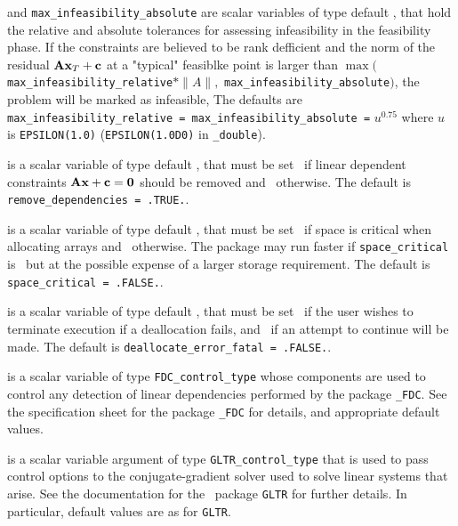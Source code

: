 \begin{description}
 and {\tt max\_infeasibility\_absolute}
are scalar variables of type default \realdp,
that hold the relative and absolute tolerances for assessing
infeasibility in the feasibility phase.  If the constraints are believed to be
rank defficient and the norm of the residual ${\mathbf{A}} {\mathbf{x}}_T + {\mathbf{c}}$
at a "typical" feasiblke point is larger than
  $\max( ${\tt max\_infeasibility\_relative}$ \ast \| A\|,$
{\tt max\_infeasibility\_absolute}$)$,
the problem will be marked as infeasible,
The defaults are
{\tt max\_infeasibility\_relative =
\tt max\_infeasibility\_absolute =} $u^{0.75}$
where $u$ is {\tt EPSILON(1.0)} ({\tt EPSILON(1.0D0)} in
{\tt \fullpackagename\_double}).

 is a scalar variable of type default \logical,
that must be set \true\ if linear dependent constraints
${\mathbf{A}} {\mathbf{x}} + {\mathbf{c}} = {\mathbf{0}}$ should be removed and \false\ otherwise.
The default is {\tt remove\_dependencies = .TRUE.}.


 is a scalar variable of type default \logical,
that must be set \true\ if space is critical when allocating arrays
and  \false\ otherwise. The package may run faster if
{\tt space\_critical} is \false\ but at the possible expense of a larger
storage requirement. The default is {\tt space\_critical = .FALSE.}.

 is a scalar variable of type default \logical,
that must be set \true\ if the user wishes to terminate execution if
a deallocation  fails, and \false\ if an attempt to continue
will be made. The default is {\tt deallocate\_error\_fatal = .FALSE.}.

 is a scalar variable of type
{\tt FDC\_control\_type}
whose components are used to control any detection of linear dependencies
performed by the package
{\tt \libraryname\_FDC}.
See the specification sheet for the package
{\tt \libraryname\_FDC}
for details, and appropriate default values.

 is a scalar variable argument of type
{\tt GLTR\_control\_type} that is used to pass control
options to the conjugate-gradient solver used to solve linear systems that arise.
See the documentation for the \galahad\ package {\tt GLTR} for further details.
In particular, default values are as for {\tt GLTR}.


\end{description}
